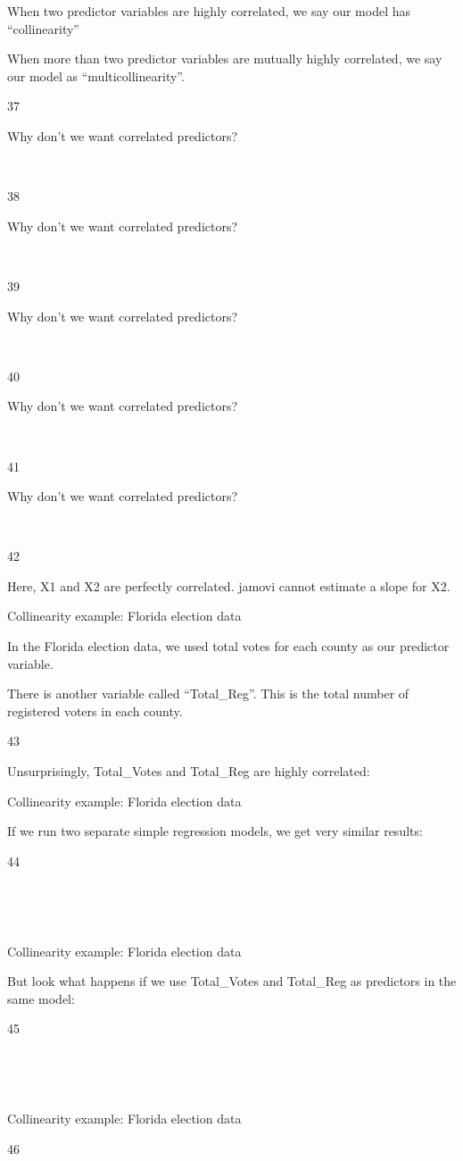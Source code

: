\documentclass[
  letterpaper,
  DIV=11,
  numbers=noendperiod]{scrreprt}
\begin{document}
When two predictor variables are highly correlated, we say our model has
``collinearity''

When more than two predictor variables are mutually highly correlated,
we say our model as ``multicollinearity''.

37

Why don't we want correlated predictors?

~

38

Why don't we want correlated predictors?

~

39

Why don't we want correlated predictors?

~

40

Why don't we want correlated predictors?

~

41

Why don't we want correlated predictors?

~

42

Here, X1 and X2 are perfectly correlated. jamovi cannot estimate a slope
for X2.

Collinearity example: Florida election data

In the Florida election data, we used total votes for each county as our
predictor variable.

There is another variable called ``Total\_Reg''. This is the total
number of registered voters in each county.

43

Unsurprisingly, Total\_Votes and Total\_Reg are highly correlated:

Collinearity example: Florida election data

If we run two separate simple regression models, we get very similar
results:

44

~

~

Collinearity example: Florida election data

But look what happens if we use Total\_Votes and Total\_Reg as
predictors in the same model:

45

~

~

Collinearity example: Florida election data

46
\end{document}
